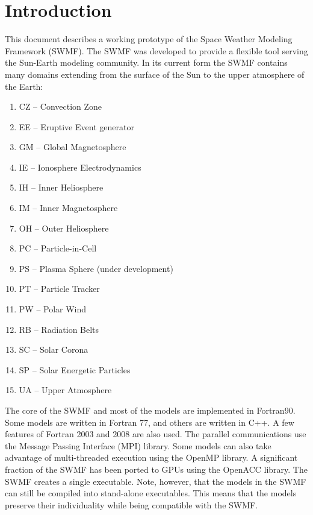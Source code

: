 
\chapter{Introduction}

This document describes a working prototype of the 
Space Weather Modeling Framework (SWMF).
The SWMF was developed to provide a flexible tool serving the Sun-Earth
modeling community.  In its current form the SWMF contains many 
domains extending from the surface of the Sun to the upper atmosphere of the 
Earth: 
\begin{enumerate}
\item CZ -- Convection Zone
\item EE -- Eruptive Event generator
\item GM -- Global Magnetosphere 
\item IE -- Ionosphere Electrodynamics
\item IH -- Inner Heliosphere
\item IM -- Inner Magnetosphere
\item OH -- Outer Heliosphere
\item PC -- Particle-in-Cell
\item PS -- Plasma Sphere (under development)
\item PT -- Particle Tracker
\item PW -- Polar Wind
\item RB -- Radiation Belts
\item SC -- Solar Corona
\item SP -- Solar Energetic Particles 
\item UA -- Upper Atmosphere
\end{enumerate}
The core of the SWMF and most of the models are implemented in Fortran90.
Some models are written in Fortran 77, and others are written in C++.
A few features of Fortran 2003 and 2008 are also used.
The parallel communications use the Message Passing Interface (MPI) library. 
Some models can also take advantage of multi-threaded execution using the 
OpenMP library. A significant fraction of the SWMF has been ported to GPUs
using the OpenACC library.
The SWMF creates a single executable. Note, however, that the
models in the SWMF can still be compiled into stand-alone executables.
This means that the models preserve their individuality while being
compatible with the SWMF.

